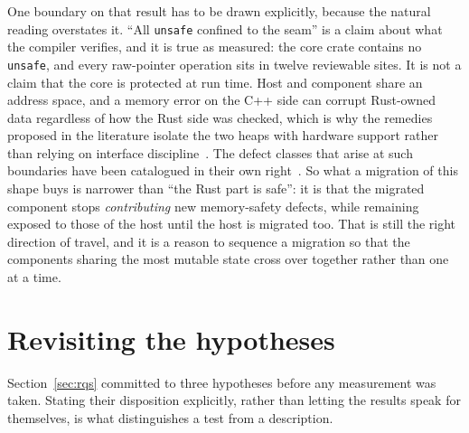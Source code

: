 \documentclass[english,twoside,openright,a4paper,censored,csm,software-track-2020]{HYthesisML}
\begin{document}
One boundary on that result has to be drawn explicitly, because the natural reading overstates
it. ``All \texttt{unsafe} confined to the seam'' is a claim about what the compiler verifies,
and it is true as measured: the core crate contains no \texttt{unsafe}, and every raw-pointer
operation sits in twelve reviewable sites. It is not a claim that the core is protected at run
time. Host and component share an address space, and a memory error on the C++ side can corrupt
Rust-owned data regardless of how the Rust side was checked, which is why the remedies proposed
in the literature isolate the two heaps with hardware support rather than relying on interface
discipline~\cite{rivera2021galeed,kirth2022pkrusafe}. The defect classes that arise at such
boundaries have been catalogued in their own right~\cite{li2022crosslang}. So what a migration
of this shape buys is narrower than ``the Rust part is safe'': it is that the migrated
component stops \emph{contributing} new memory-safety defects, while remaining exposed to those
of the host until the host is migrated too. That is still the right direction of travel, and it
is a reason to sequence a migration so that the components sharing the most mutable state cross
over together rather than one at a time.

\section{Revisiting the hypotheses}\label{sec:hypotheses}
Section~\ref{sec:rqs} committed to three hypotheses before any measurement was
taken. Stating their disposition explicitly, rather than letting the results speak for
themselves, is what distinguishes a test from a description.
\end{document}
